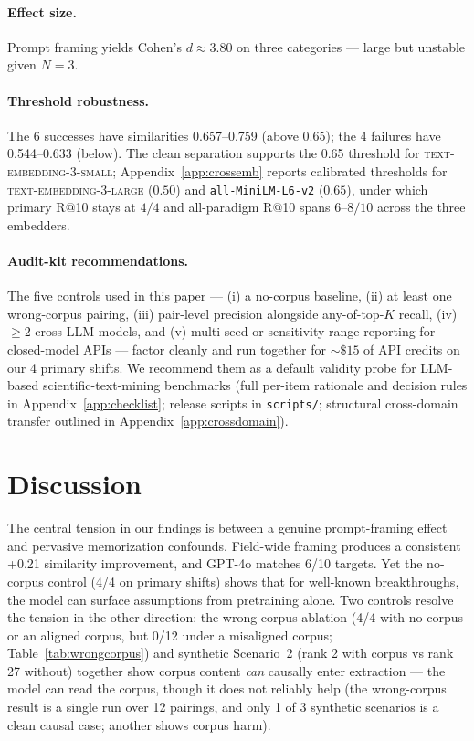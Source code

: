\documentclass[11pt]{article}
\newcommand{\fpath}[1]{\mbox{}\nolinkurl{#1}}
\begin{document}
\paragraph{Effect size.}
Prompt framing yields Cohen's $d \approx 3.80$ on three categories --- large but unstable given $N = 3$.

\paragraph{Threshold robustness.}
The 6 successes have similarities 0.657--0.759 (above 0.65); the 4 failures have 0.544--0.633 (below). The clean separation supports the 0.65 threshold for \textsc{text-embedding-3-small}; Appendix~\ref{app:crossemb} reports calibrated thresholds for \textsc{text-embedding-3-large} ($0.50$) and \texttt{all-MiniLM-L6-v2} ($0.65$), under which primary R@10 stays at $4/4$ and all-paradigm R@10 spans $6$--$8/10$ across the three embedders.

\paragraph{Audit-kit recommendations.}\label{sec:recommendations}
The five controls used in this paper --- (i) a no-corpus baseline, (ii) at least one wrong-corpus pairing, (iii) pair-level precision alongside any-of-top-$K$ recall, (iv) ${\geq}2$ cross-LLM models, and (v) multi-seed or sensitivity-range reporting for closed-model APIs --- factor cleanly and run together for ${\sim}\$15$ of API credits on our 4 primary shifts. We recommend them as a default validity probe for LLM-based scientific-text-mining benchmarks (full per-item rationale and decision rules in Appendix~\ref{app:checklist}; release scripts in \fpath{scripts/}; structural cross-domain transfer outlined in Appendix~\ref{app:crossdomain}).

\section{Discussion}\label{sec:discussion}

The central tension in our findings is between a genuine prompt-framing effect and pervasive memorization confounds. Field-wide framing produces a consistent +0.21 similarity improvement, and GPT-4o matches 6/10 targets. Yet the no-corpus control (4/4 on primary shifts) shows that for well-known breakthroughs, the model can surface assumptions from pretraining alone. Two controls resolve the tension in the other direction: the wrong-corpus ablation (4/4 with no corpus or an aligned corpus, but 0/12 under a misaligned corpus; Table~\ref{tab:wrongcorpus}) and synthetic Scenario~2 (rank 2 with corpus vs rank 27 without) together show corpus content \emph{can} causally enter extraction --- the model can read the corpus, though it does not reliably help (the wrong-corpus result is a single run over 12 pairings, and only 1 of 3 synthetic scenarios is a clean causal case; another shows corpus harm).
\end{document}
